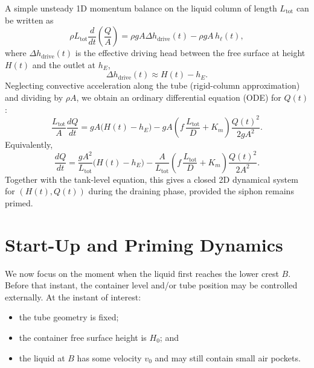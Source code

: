 \documentclass[11pt]{article}
\begin{document}
A simple unsteady 1D momentum balance on the liquid column of length $L_{\text{tot}}$ can be written as
\begin{equation}
  \rho L_{\text{tot}} \frac{d}{dt}\!\left(\frac{Q}{A}\right)
  = \rho g A \Delta h_{\text{drive}}(t) - \rho g A\, h_{\ell}(t),
  \label{eq:unsteady-momentum}
\end{equation}
where $\Delta h_{\text{drive}}(t)$ is the effective driving head between the free surface at height $H(t)$ and the outlet at $h_E$,
\begin{equation}
  \Delta h_{\text{drive}}(t) \approx H(t) - h_E.
\end{equation}
Neglecting convective acceleration along the tube (rigid-column approximation) and dividing by $\rho A$, we obtain an ordinary differential equation (ODE) for $Q(t)$:
\begin{equation}
  \frac{L_{\text{tot}}}{A} \frac{dQ}{dt}
  = g A \bigl(H(t) - h_E\bigr)
  - g A \left( f\,\frac{L_{\text{tot}}}{D} + K_m \right)\frac{Q(t)^2}{2gA^2}.
\end{equation}
Equivalently,
\begin{equation}
  \frac{dQ}{dt}
  = \frac{gA^2}{L_{\text{tot}}}\bigl(H(t) - h_E\bigr)
  - \frac{A}{L_{\text{tot}}}\left( f\,\frac{L_{\text{tot}}}{D} + K_m \right)\frac{Q(t)^2}{2A^2}.
  \label{eq:Q-ODE}
\end{equation}
Together with the tank-level equation, this gives a closed 2D dynamical system for $(H(t), Q(t))$ during the draining phase, provided the siphon remains primed.

\section{Start-Up and Priming Dynamics}
\label{sec:priming}

We now focus on the moment when the liquid first reaches the lower crest $B$.
Before that instant, the container level and/or tube position may be controlled externally.
At the instant of interest:
\begin{itemize}
  \item the tube geometry is fixed;
  \item the container free surface height is $H_0$; and
  \item the liquid at $B$ has some velocity $v_0$ and may still contain small air pockets.
\end{itemize}
\end{document}
